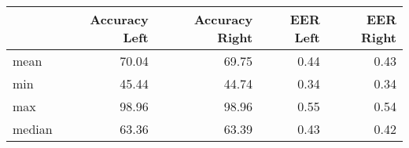 \begin{tabular}{lrrrr}
\toprule
{} &  Accuracy Left &  Accuracy Right &  EER Left &  EER Right \\
\midrule
mean   &          70.04 &           69.75 &      0.44 &       0.43 \\
min    &          45.44 &           44.74 &      0.34 &       0.34 \\
max    &          98.96 &           98.96 &      0.55 &       0.54 \\
median &          63.36 &           63.39 &      0.43 &       0.42 \\
\bottomrule
\end{tabular}
